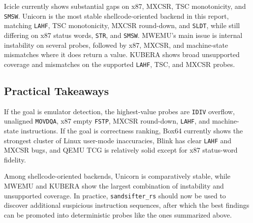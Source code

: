 Icicle currently shows substantial gaps on x87, MXCSR, TSC monotonicity, and \texttt{SMSW}. Unicorn is the most stable shellcode-oriented backend in this report, matching \texttt{LAHF}, TSC monotonicity, MXCSR round-down, and \texttt{SLDT}, while still differing on x87 status words, \texttt{STR}, and \texttt{SMSW}. MWEMU's main issue is internal instability on several probes, followed by x87, MXCSR, and machine-state mismatches where it does return a value. KUBERA shows broad unsupported coverage and mismatches on the supported \texttt{LAHF}, TSC, and MXCSR probes.

\subsection{Practical Takeaways}

If the goal is emulator detection, the highest-value probes are \texttt{IDIV} overflow, unaligned \texttt{MOVDQA}, x87 empty \texttt{FSTP}, MXCSR round-down, \texttt{LAHF}, and machine-state instructions. If the goal is correctness ranking, Box64 currently shows the strongest cluster of Linux user-mode inaccuracies, Blink has clear \texttt{LAHF} and MXCSR bugs, and QEMU TCG is relatively solid except for x87 status-word fidelity.

Among shellcode-oriented backends, Unicorn is comparatively stable, while MWEMU and KUBERA show the largest combination of instability and unsupported coverage. In practice, \texttt{sandsifter\_rs} should now be used to discover additional suspicious instruction sequences, after which the best findings can be promoted into deterministic probes like the ones summarized above.
